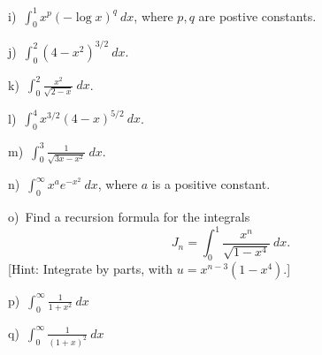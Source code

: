 \documentclass[12pt]{article}
\theoremstyle{definition}
\theoremstyle{remark}
\theoremstyle{definition}
\begin{document}
i)\ $\int_0^1x^p(-\log x)^q\ dx$, where $p,q$ are postive constants.

j)\ $\int_0^2(4-x^2)^{3/2}\ dx$. 

k)\ $\int_0^2\frac{x^2}{\sqrt{2-x}}\ dx$.

l)\ $\int_0^4x^{3/2}(4-x)^{5/2}\ dx$.

m)\ $\int_0^3\frac{1}{\sqrt{3x-x^2}}\ dx$.

n)\ $\int_0^\infty x^a e^{-x^2}\ dx$, where $a$ is a positive constant.

o)\ Find a recursion formula for the integrals 
\[J_n=\int_0^1 \frac{x^n}{\sqrt{1-x^4}}\ dx.\]
[Hint: Integrate by parts, with $u=x^{n-3}(1-x^4)$.]


p)\ $\int_0^\infty\frac{1}{1+x^2}\ dx$

q)\ $\int_0^\infty \frac{1}{(1+x)^2}\ dx$
\end{document}
